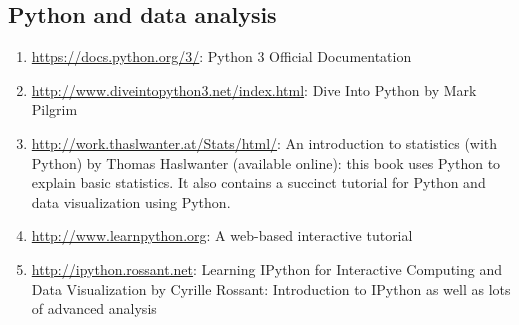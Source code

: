 \documentclass[11pt,article,oneside]{memoir} %
\begin{document}
\subsection{Python and data analysis}%

\begin{enumerate}%

\item \url{https://docs.python.org/3/}: Python 3 Official Documentation

\item \url{http://www.diveintopython3.net/index.html}: Dive Into Python by Mark Pilgrim 

\item \url{http://work.thaslwanter.at/Stats/html/}: An introduction to statistics (with Python) by Thomas Haslwanter (available online): this book uses Python to explain basic statistics. It also contains a succinct tutorial for Python and data visualization using Python. 

\item \url{http://www.learnpython.org}: A web-based interactive tutorial 

\item \url{http://ipython.rossant.net}: Learning IPython for Interactive Computing and Data Visualization by Cyrille Rossant: Introduction to IPython as well as lots of advanced analysis 

\end{enumerate}%




\end{document}
